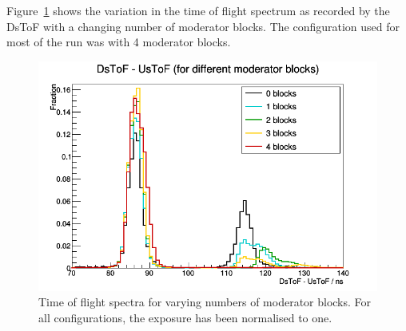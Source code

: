 	Figure~\ref{fig:dtof_nmodblocks} shows the variation in the time of flight spectrum as recorded by the DsToF with a changing number of moderator blocks. The configuration used for most of the run was with 4 moderator blocks. 
			
	

   	\begin{figure}[h]
        \centering
	    \includegraphics[width=0.7\linewidth]{files/Figures/AllInOne.png}
        \caption{Time of flight spectra for varying numbers of moderator blocks. For all configurations, the exposure has been normalised to one.}
        \label{fig:dtof_nmodblocks}	
   	\end{figure}
        
